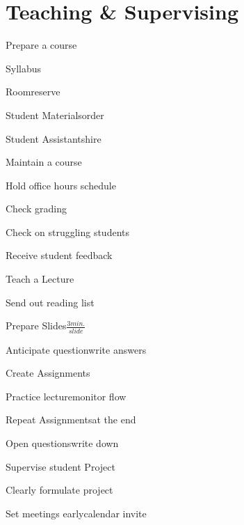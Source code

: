 \section{Teaching \& Supervising}

\begin{checklist}{Prepare a course}
\item{Syllabus}{}
\item{Room}{reserve}
\item{Student Materials}{order}
\item{Student Assistants}{hire}
\end{checklist}

\begin{checklist}{Maintain a course}
\item{Hold office hours}{ schedule}
\item{Check grading}{}
\item{Check on struggling students}{}
\item{Receive student feedback}{}
\end{checklist}


\begin{checklist}{Teach a Lecture}
\item{Send out reading list}{}
\item{Prepare Slides}{$\frac{3min.}{slide}$}
\item{Anticipate question}{write answers}
\item{Create Assignments}{}
\item{Practice lecture}{monitor flow}
\item{Repeat Assignments}{at the end}
\item{Open questions}{write down}
\end{checklist}

\begin{checklist}{Supervise student Project}
\item{Clearly formulate project}{}
\item{Set meetings early}{calendar invite}
\end{checklist}

